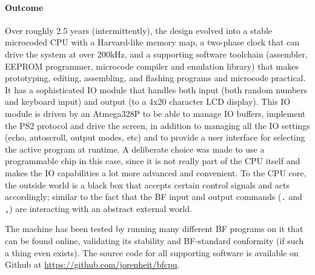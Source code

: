 \paragraph{Outcome}
Over roughly 2.5 years (intermittently), the design evolved into a stable microcoded CPU with a Harvard-like memory map, a two-phase clock that can drive the system at over 200kHz, and a supporting software toolchain (assembler, EEPROM programmer, microcode compiler and emulation library) that makes prototyping, editing, assembling, and flashing programs and microcode practical. It has a sophisticated IO module that handles both input (both random numbers and keyboard input) and output (to a 4x20 character LCD display). This IO module is driven by an Atmega328P to be able to manage IO buffers, implement the PS2 protocol and drive the screen, in addition to managing all the IO settings (echo, autoscroll, output modes, etc) and to provide a user interface for selecting the active program at runtime. A deliberate choice was made to use a programmable chip in this case, since it is not really part of the CPU itself and makes the IO capabilities a lot more advanced and convenient. To the CPU core, the outside world is a black box that accepts certain control signals and acts accordingly; similar to the fact that the BF input and output commands (\texttt{.} and \texttt{,}) are interacting with an abstract external world.

The machine has been tested by running many different BF programs on it that can be found online, validating its stability and BF-standard conformity (if such a thing even exists). The source code for all supporting software is available on Github at \url{https://github.com/jorenheit/bfcpu}.

\newpage
